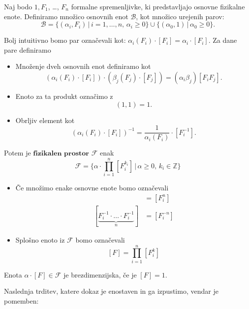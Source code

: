 \documentclass[mat2, tisk]{fmfdelo}
\newcommand{\Z}{\mathbb Z}
\newcommand{\bd}{\textbf}
\begin{document}

 \begin{definicija}
 Naj bodo $1, F_1$, \dots, $F_n$ formalne spremenljivke, ki predstavljajo 
 osnovne fizikalne enote. Definiramo množico osnovnih enot $\mathcal{B}$, kot 
 množico urejenih parov: 
 $$
 \mathcal{B} = \{(\alpha_i, F_i) \,|\, i= 1, \dots, n, \, \alpha_i \geq 0\} \cup \{(\alpha_0, 1) \,|\, \alpha_0 \geq 0\}.
 $$

Bolj intuitivno bomo par označevali kot: $\alpha_i(F_i)\cdot [F_i] = \alpha_i \cdot [F_i]$. 
Za dane pare definiramo 
\begin{itemize}
  \item Množenje dveh osnovnih enot definiramo kot  
  $$
  (\alpha_i(F_i)\cdot [F_i]) \cdot (\beta_j(F_j)\cdot [F_j]) = (\alpha_i \beta_j)[F_i F_j].
  $$
  \item Enoto za ta produkt označimo z 
  $$
  (1, 1) = 1.
  $$
  \item Obrljiv element kot 
  $$
  (\alpha_i(F_i)\cdot [F_i])^{-1} = \frac{1}{\alpha_i{(F_i)}} \cdot [F_i^{-1}].
  $$

\end{itemize}

Potem je $\bd{fizikalen prostor}$ $\mathcal{F}$ enak 
$$
\mathcal{F} = \{\alpha \cdot \prod_{i=1}^n [F_i^{k_i}] \,|\, \alpha \geq 0,\, k_i\in \Z\}
$$
\end{definicija}

\begin{opomba}
\hfill
\begin{itemize}
 \item Če množimo enake osnovne enote bomo označevali
  \begin{align*}
    [\underbrace{F_i \cdot \ldots \cdot F_i}_n] &= [F^n_i] \\
    [\underbrace{F_i^{-1} \cdot \dots \cdot F_i^{-1}}_n] &= [F^{-n}_{i}]
  \end{align*}
\item Splošno enoto iz $\mathcal{F}$ bomo označevali 
$$
[F] = \prod_{i=1}^n [F_i^{k}]
$$
\end{itemize}
\end{opomba}

\begin{definicija}
Enota $\alpha\cdot[F] \in \mathcal{F}$ je brezdimenzijska, če je $[F] = 1$.
\end{definicija}

Naslednja trditev, katere dokaz je enostaven in ga izpustimo, vendar je pomemben: 
\end{document}

